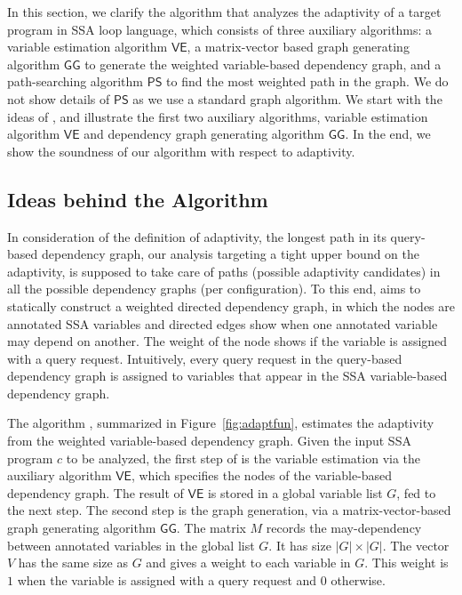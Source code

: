 In this section, we clarify the algorithm {\THESYSTEM} that analyzes the adaptivity of a target program in SSA loop language, which consists of three auxiliary algorithms: a variable estimation algorithm $\mathsf{VE}$, a matrix-vector based graph generating algorithm $\mathsf{GG}$ to generate the weighted variable-based dependency graph, and a path-searching algorithm $\mathsf{PS}$ to find the most weighted path in the graph. We do not show details of  $\mathsf{PS}$ as we use a standard graph algorithm.
We start with the ideas of {\THESYSTEM}, and illustrate the first two auxiliary algorithms, variable estimation algorithm $\mathsf{VE}$ and dependency graph generating algorithm $\mathsf{GG}$. 
In the end, we show the soundness of our algorithm with respect to adaptivity.  


\subsection{Ideas behind the Algorithm}
In consideration of the definition of adaptivity, the longest path in its query-based dependency graph, our analysis targeting a tight upper bound on the
adaptivity, is supposed to take care of paths (possible adaptivity candidates) in all the possible dependency graphs (per configuration).
To this end, {\THESYSTEM} aims to statically construct a weighted directed dependency graph, in which the nodes are annotated SSA variables and directed edges show when one annotated variable may depend on another. The weight of the node shows if the variable is assigned with a query request. Intuitively, every query request in the query-based dependency graph is assigned to variables that appear in the SSA variable-based dependency graph. 

The algorithm {\THESYSTEM}, summarized in Figure~\ref{fig:adaptfun}, estimates the adaptivity from the weighted variable-based dependency graph. Given the input SSA program $c$ to be analyzed, the first step of {\THESYSTEM} is the variable estimation via the auxiliary algorithm $\mathsf{VE}$, which specifies the nodes of the variable-based dependency graph. The result of $\mathsf{VE}$ is stored in a global variable list $G$, fed to the next step. The second step is the graph generation, via a matrix-vector-based graph generating algorithm $\mathsf{GG}$. The matrix $M$ records the may-dependency between annotated variables in the global list $G$. It has size $|G| \times |G|$. The vector $V$ has the same size as $G$ and gives a weight to each variable in $G$. This weight is $1$ when the variable is assigned with a query request and $0$ otherwise. 

